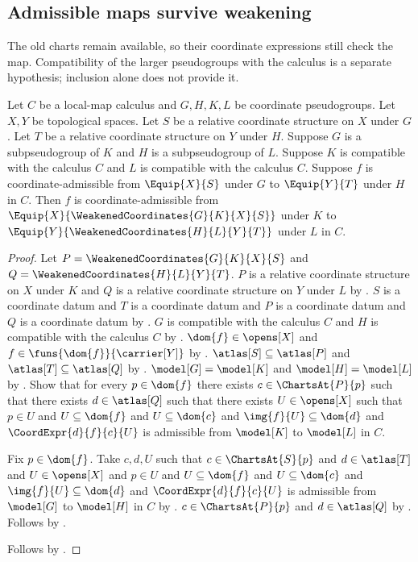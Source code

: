 \subsection{Admissible maps survive weakening}

The old charts remain available, so their coordinate expressions still check
the map. Compatibility of the larger pseudogroups with the calculus is a
separate hypothesis; inclusion alone does not provide it.

\begin{theorem}\label{weakened_coordinates_admissible}
    Let $C$ be a local-map calculus and $G,H,K,L$ be coordinate pseudogroups.
    Let $X,Y$ be topological spaces.
    Let $S$ be a relative coordinate structure on $X$ under $G$.
    Let $T$ be a relative coordinate structure on $Y$ under $H$.
    Suppose $G$ is a subpseudogroup of $K$ and $H$ is a subpseudogroup of $L$.
    Suppose $K$ is compatible with the calculus $C$ and $L$ is compatible with the calculus $C$.
    Suppose $f$ is coordinate-admissible from $\Equip{X}{S}$ under $G$ to $\Equip{Y}{T}$ under $H$ in $C$.
    Then $f$ is coordinate-admissible
        from $\Equip{X}{\WeakenedCoordinates{G}{K}{X}{S}}$ under $K$
        to $\Equip{Y}{\WeakenedCoordinates{H}{L}{Y}{T}}$ under $L$ in $C$.
\end{theorem}
\begin{proof}
    Let $P=\WeakenedCoordinates{G}{K}{X}{S}$ and $Q=\WeakenedCoordinates{H}{L}{Y}{T}$.
    $P$ is a relative coordinate structure on $X$ under $K$ and
        $Q$ is a relative coordinate structure on $Y$ under $L$ by .
    $S$ is a coordinate datum and $T$ is a coordinate datum and
        $P$ is a coordinate datum and $Q$ is a coordinate datum by .
    $G$ is compatible with the calculus $C$ and $H$ is compatible with the calculus $C$ by
        .
    $\dom{f}\in\opens[X]$ and $f\in\funs{\dom{f}}{\carrier[Y]}$ by
        .
    $\atlas[S]\subseteq\atlas[P]$ and $\atlas[T]\subseteq\atlas[Q]$ by
        .
    $\model[G]=\model[K]$ and $\model[H]=\model[L]$ by .
    Show that for every $p\in\dom{f}$ there exists $c\in\ChartsAt{P}{p}$ such that
        there exists $d\in\atlas[Q]$ such that there exists $U\in\opens[X]$ such that
            $p\in U$ and $U\subseteq\dom{f}$ and $U\subseteq\dom{c}$ and
            $\img{f}{U}\subseteq\dom{d}$ and
            $\CoordExpr{d}{f}{c}{U}$ is admissible from $\model[K]$ to $\model[L]$ in $C$.
    \begin{subproof}
        Fix $p\in\dom{f}$.
        Take $c,d,U$ such that $c\in\ChartsAt{S}{p}$ and $d\in\atlas[T]$ and
            $U\in\opens[X]$ and $p\in U$ and $U\subseteq\dom{f}$ and $U\subseteq\dom{c}$ and
            $\img{f}{U}\subseteq\dom{d}$ and
            $\CoordExpr{d}{f}{c}{U}$ is admissible from $\model[G]$ to $\model[H]$ in $C$ by
            .
        $c\in\ChartsAt{P}{p}$ and $d\in\atlas[Q]$ by .
        Follows by \auto.
    \end{subproof}
    Follows by .
\end{proof}
